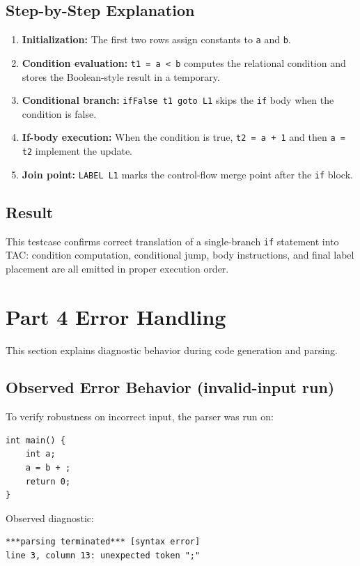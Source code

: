 \documentclass[a4paper,12pt]{article}
\begin{document}
\subsection{Step-by-Step Explanation}
\begin{enumerate}
    \item \textbf{Initialization:} The first two rows assign constants to \texttt{a} and \texttt{b}.
    \item \textbf{Condition evaluation:} \texttt{t1 = a < b} computes the relational condition and stores the Boolean-style result in a temporary.
    \item \textbf{Conditional branch:} \texttt{ifFalse t1 goto L1} skips the \texttt{if} body when the condition is false.
    \item \textbf{If-body execution:} When the condition is true, \texttt{t2 = a + 1} and then \texttt{a = t2} implement the update.
    \item \textbf{Join point:} \texttt{LABEL L1} marks the control-flow merge point after the \texttt{if} block.
\end{enumerate}

\subsection{Result}
This testcase confirms correct translation of a single-branch \texttt{if} statement into TAC: condition computation, conditional jump, body instructions, and final label placement are all emitted in proper execution order.


\section{Part 4 Error Handling}

This section explains diagnostic behavior during code generation and parsing.

\subsection{Observed Error Behavior (invalid-input run)}
To verify robustness on incorrect input, the parser was run on:
\begin{lstlisting}
int main() {
    int a;
    a = b + ;
    return 0;
}
\end{lstlisting}

Observed diagnostic:
\begin{lstlisting}
***parsing terminated*** [syntax error]
line 3, column 13: unexpected token ";"
\end{lstlisting}
\end{document}
